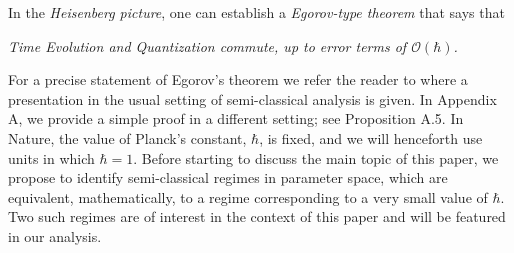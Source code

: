 \documentclass[11pt]{article}
\begin{document}
In the \textit{Heisenberg picture}, one can establish a \textit{Egorov-type theorem} that says that

\hspace{1.2cm} \textit{ Time Evolution and Quantization commute, up to error terms of $\mathcal{O}(\hbar)$.}

For a precise statement of Egorov's theorem we refer the reader to \cite{BR} where a presentation in the usual setting of semi-classical analysis is given. In Appendix A, we provide a simple proof in a different setting; see Proposition A.5.
In Nature, the value of Planck's constant, $\hbar$, is fixed, and we will henceforth use units in which $\hbar=1$.
Before starting to discuss the main topic of this paper, we propose to identify semi-classical regimes in parameter space,
which are equivalent, mathematically, to a regime corresponding to a very small value of $\hbar$.
Two such regimes are of interest in the context of this paper and will be featured in our analysis.
\end{document}
